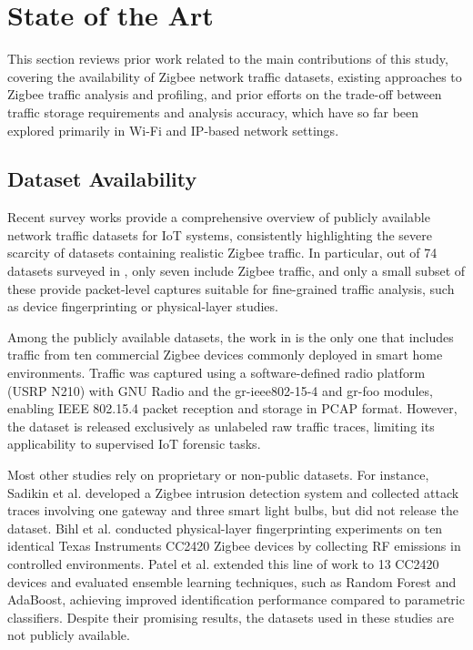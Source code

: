 \section{State of the Art}
\label{state-of-the-art}
This section reviews prior work related to the main contributions of this study, covering the availability of Zigbee network traffic datasets, existing approaches to Zigbee traffic analysis and profiling, and prior efforts on the trade-off between traffic storage requirements and analysis accuracy, which have so far been explored primarily in Wi-Fi and IP-based network settings.

\subsection{Dataset Availability}
Recent survey works provide a comprehensive overview of publicly available network traffic datasets for IoT systems, consistently highlighting the severe scarcity of datasets containing realistic Zigbee traffic. In particular, out of 74 datasets surveyed in \cite{de2023survey}, only seven include Zigbee traffic, and only a small subset of these provide packet-level captures suitable for fine-grained traffic analysis, such as device fingerprinting or physical-layer studies.

Among the publicly available datasets, the work in \cite{c7-nvc6-4q28-22} is the only one that includes traffic from ten commercial Zigbee devices commonly deployed in smart home environments. Traffic was captured using a software-defined radio platform (USRP N210) with GNU Radio and the gr-ieee802-15-4 and gr-foo modules, enabling IEEE 802.15.4 packet reception and storage in PCAP format. However, the dataset is released exclusively as unlabeled raw traffic traces, limiting its applicability to supervised IoT forensic tasks.

Most other studies rely on proprietary or non-public datasets. For instance, Sadikin et al. \cite{sadikin2020zigbee} developed a Zigbee intrusion detection system and collected attack traces involving one gateway and three smart light bulbs, but did not release the dataset. Bihl et al. \cite{bihl2016feature} conducted physical-layer fingerprinting experiments on ten identical Texas Instruments CC2420 Zigbee devices by collecting RF emissions in controlled environments. Patel et al. \cite{patel2014improving} extended this line of work to 13 CC2420 devices and evaluated ensemble learning techniques, such as Random Forest and AdaBoost, achieving improved identification performance compared to parametric classifiers. Despite their promising results, the datasets used in these studies are not publicly available.

